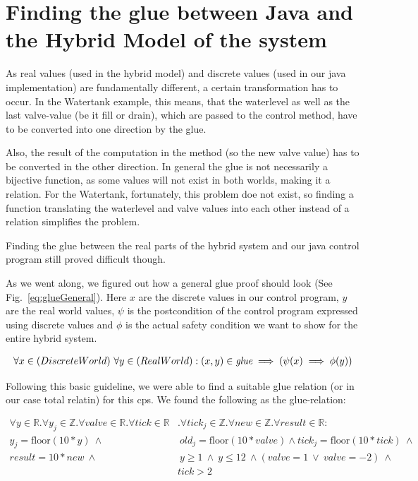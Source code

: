 \section{Finding the glue between Java and the Hybrid Model of the system}
\label{sec:Watertank:Glue}

As real values (used in the hybrid model) and discrete values (used in our java implementation) are fundamentally different, a certain transformation has to occur.  In the Watertank example, this means, that the waterlevel as well as the last valve-value (be it fill or drain), which are passed to the control method, have to be converted into one direction by the glue. 

Also, the result of the computation in the method (so the new valve value) has to be converted in the other direction. In general the glue is not necessarily a bijective function, as some values will not exist in both worlds, making it a relation. For the Watertank, fortunately, this problem doe not exist, so finding a function translating the waterlevel and valve values into each other instead of a relation simplifies the problem.

Finding the glue between the real parts of the hybrid system and our java control program still proved difficult though.

As we went along, we figured out how a general glue proof should look (See Fig.~\ref{eq:glueGeneral}). Here \(x\) are the discrete values in our control program, \(y\) are the real world values, \(\psi\) is the postcondition of the control program expressed using discrete values and \(\phi\) is the actual safety condition we want to show for the entire hybrid system.

\begin{equation}
	\centering
	\begin{split}
		\forall x \in (Discrete World)~\forall y \in (Real World):(x,y) \in \textit{glue} \implies (\psi(x) \implies \phi(y))
	\end{split}
	\label{eq:glueGeneral}
\end{equation}

Following this basic guideline, we were able to find a suitable glue relation (or in our case total relatin) for this cps. We found the following as the glue-relation:

\begin{equation}
	\begin{split}
		\forall y \in \mathbb{R} . \forall y_j \in \mathbb{Z}. \forall valve \in \mathbb{R}. \forall tick \in \mathbb{R}&. \forall tick_j \in \mathbb{Z} . \forall new \in \mathbb{Z}. \forall result \in \mathbb{R} : \\  y_j = \textrm{floor}(10 * y)~\wedge&~ old_j = \textrm{floor}(10*valve) \wedge tick_j = \textrm{floor}(10*tick)~\wedge \\ result = 10 * new~\wedge&~ y \geq 1~\wedge~y \leq 12~\wedge  (valve = 1 ~\vee~valve = -2)~\wedge \\&tick > 2 
	\end{split}
	\label{eq:glueWatertank}
\end{equation}

